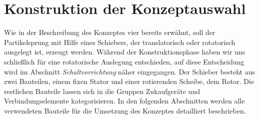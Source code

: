 \section{Konstruktion der Konzeptauswahl}
Wie in der Beschreibung des Konzeptes vier bereits erw\"{a}hnt, soll der Partikelsprung mit Hilfe eines Schiebers, der translatorisch oder rotatorisch ausgelegt ist, erzeugt werden. W\"{a}hrend der Konstruktionsphase haben wir uns schlie{\ss}lich f\"{u}r eine rotatorische Auslegung entschieden, auf diese Entscheidung wird im Abschnitt \textit{Schaltvorrichtung} n\"{a}her eingegangen. Der Schieber besteht aus zwei Bauteilen, einem fixen Stator und einer rotierenden Scheibe, dem Rotor. Die restlichen Bauteile lassen sich in die Gruppen Zukaufger\"{a}te und Verbindungselemente kategorisieren. In den folgenden Abschnitten werden alle verwendeten Bauteile f\"{u}r die Umsetzung des Konzeptes detailliert beschrieben.

